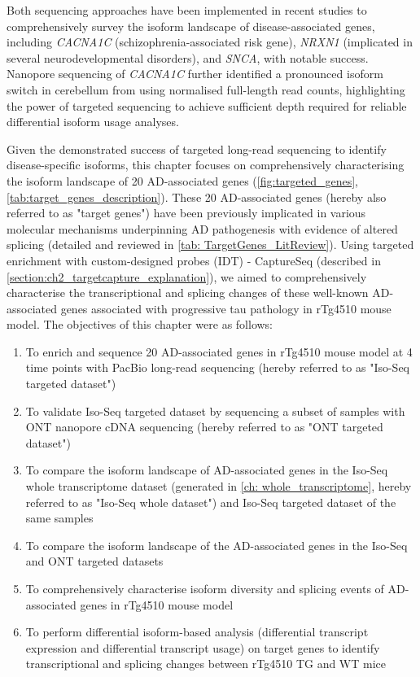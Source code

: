 Both sequencing approaches have been implemented in recent studies\cite{Clark2019,Treutlein2014,Tseng2019} to comprehensively survey the isoform landscape of disease-associated genes, including \textit{CACNA1C} (schizophrenia-associated risk gene)\cite{Clark2019}, \textit{NRXN1} (implicated in several neurodevelopmental disorders)\cite{Treutlein2014}, and \textit{SNCA}\cite{Tseng2019}, with notable success. Nanopore sequencing of \textit{CACNA1C} further identified a pronounced isoform switch in cerebellum from using normalised full-length read counts\cite{Clark2019}, highlighting the power of targeted sequencing to achieve sufficient depth required for reliable differential isoform usage analyses. 

Given the demonstrated success of targeted long-read sequencing to identify disease-specific isoforms, this chapter focuses on comprehensively characterising the isoform landscape of 20 AD-associated genes (\cref{fig:targeted_genes}, \cref{tab:target_genes_description}). These 20 AD-associated genes (hereby also referred to as "target genes") have been previously implicated in various molecular mechanisms underpinning AD pathogenesis with evidence of altered splicing (detailed and reviewed in \cref{tab: TargetGenes_LitReview}). Using targeted enrichment with custom-designed probes (IDT) - CaptureSeq (described in \cref{section:ch2_targetcapture_explanation}), we aimed to comprehensively characterise the transcriptional and splicing changes of these well-known AD-associated genes associated with progressive tau pathology in rTg4510 mouse model. The objectives of this chapter were as follows:
\begin{enumerate}
	\item To enrich and sequence 20 AD-associated genes in rTg4510 mouse model at 4 time points with PacBio long-read sequencing (hereby referred to as "Iso-Seq targeted dataset")
	\item To validate Iso-Seq targeted dataset by sequencing a subset of samples with ONT nanopore cDNA sequencing (hereby referred to as "ONT targeted dataset")
	\item To compare the isoform landscape of AD-associated genes in the Iso-Seq whole transcriptome dataset (generated in \cref{ch: whole_transcriptome}, hereby referred to as "Iso-Seq whole dataset") and Iso-Seq targeted dataset of the same samples 
	\item To compare the isoform landscape of the AD-associated genes in the Iso-Seq and ONT targeted datasets
	\item To comprehensively characterise isoform diversity and splicing events of AD-associated genes in rTg4510 mouse model 
	\item To perform differential isoform-based analysis (differential transcript expression and differential transcript usage) on target genes to identify transcriptional and splicing changes between rTg4510 TG and WT mice
\end{enumerate} 
 

